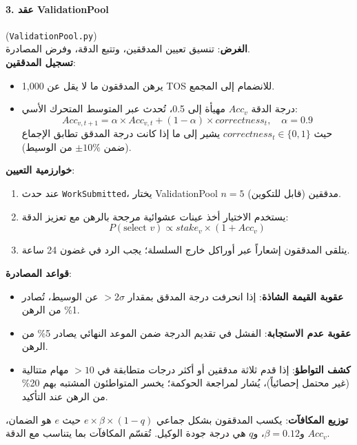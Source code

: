 \documentclass[11pt]{article}
\begin{document}
\paragraph{3. عقد ValidationPool} (\texttt{ValidationPool.py})\\
\textbf{الغرض}: تنسيق تعيين المدققين، وتتبع الدقة، وفرض المصادرة.\\
\textbf{تسجيل المدققين}:
\begin{itemize}[noitemsep]
  \item يرهن المدققون ما لا يقل عن 1,000 TOS للانضمام إلى المجمع.
  \item درجة الدقة $Acc_v$ مهيأة إلى 0.5، تُحدث عبر المتوسط المتحرك الأسي:
    \begin{equation}
    Acc_{v,t+1} = \alpha \times Acc_{v,t} + (1-\alpha) \times correctness_t, \quad \alpha = 0.9
    \end{equation}
    حيث $correctness_t \in \{0,1\}$ يشير إلى ما إذا كانت درجة المدقق تطابق الإجماع (ضمن $\pm10\%$ من الوسيط).
\end{itemize}
\textbf{خوارزمية التعيين}:
\begin{enumerate}[noitemsep]
  \item عند حدث \texttt{WorkSubmitted}، يختار ValidationPool $n=5$ مدققين (قابل للتكوين).
  \item يستخدم الاختيار أخذ عينات عشوائية مرجحة بالرهن مع تعزيز الدقة:
    \begin{equation}
    P(\text{select } v) \propto stake_v \times (1 + Acc_v)
    \end{equation}
  \item يتلقى المدققون إشعاراً عبر أوراكل خارج السلسلة؛ يجب الرد في غضون 24 ساعة.
\end{enumerate}
\textbf{قواعد المصادرة}:
\begin{itemize}[noitemsep]
  \item \textbf{عقوبة القيمة الشاذة}: إذا انحرفت درجة المدقق بمقدار $>2\sigma$ عن الوسيط، تُصادر 1\% من الرهن.
  \item \textbf{عقوبة عدم الاستجابة}: الفشل في تقديم الدرجة ضمن الموعد النهائي يصادر 5\% من الرهن.
  \item \textbf{كشف التواطؤ}: إذا قدم ثلاثة مدققين أو أكثر درجات متطابقة في $>10$ مهام متتالية (غير محتمل إحصائياً)، يُشار لمراجعة الحوكمة؛ يخسر المتواطئون المشتبه بهم 20\% من الرهن عند التأكيد.
\end{itemize}
\textbf{توزيع المكافآت}: يكسب المدققون بشكل جماعي $e \times \beta \times (1-q)$ حيث $e$ هو الضمان، و$\beta=0.12$، و$q$ هي درجة جودة الوكيل. تُقسّم المكافآت بما يتناسب مع الدقة $Acc_v$.
\end{document}
